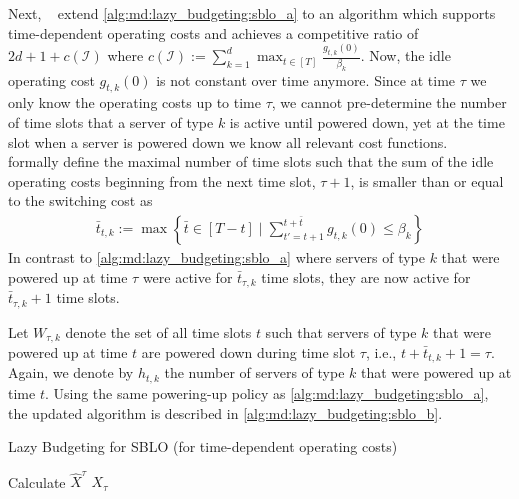 Next, \citeauthor*{Albers2021_2}~\cite{Albers2021_2} extend \cref{alg:md:lazy_budgeting:sblo_a} to an algorithm which supports time-dependent operating costs and achieves a competitive ratio of $2d + 1 + c(\mathcal{I})$ where $c(\mathcal{I}) := \sum_{k=1}^d \max_{t \in [T]} \frac{g_{t,k}(0)}{\beta_k}$. Now, the idle operating cost $g_{t,k}(0)$ is not constant over time anymore. Since at time $\tau$ we only know the operating costs up to time $\tau$, we cannot pre-determine the number of time slots that a server of type $k$ is active until powered down, yet at the time slot when a server is powered down we know all relevant cost functions. \citeauthor*{Albers2021_2}~\cite{Albers2021_2} formally define the maximal number of time slots such that the sum of the idle operating costs beginning from the next time slot, $\tau+1$, is smaller than or equal to the switching cost as \begin{align*}
    \bar{t}_{t,k} := \max \left\{\bar{t} \in [T - t] \mid \sum_{t' = t+1}^{t+\bar{t}} g_{t,k}(0) \leq \beta_k\right\}
\end{align*} In contrast to \cref{alg:md:lazy_budgeting:sblo_a} where servers of type $k$ that were powered up at time $\tau$ were active for $\bar{t}_{\tau,k}$ time slots, they are now active for $\bar{t}_{\tau,k} + 1$ time slots.

Let $W_{\tau,k}$ denote the set of all time slots $t$ such that servers of type $k$ that were powered up at time $t$ are powered down during time slot $\tau$, i.e., $t + \bar{t}_{t,k} + 1 = \tau$. Again, we denote by $h_{t,k}$ the number of servers of type $k$ that were powered up at time $t$. Using the same powering-up policy as \cref{alg:md:lazy_budgeting:sblo_a}, the updated algorithm is described in \cref{alg:md:lazy_budgeting:sblo_b}.

\begin{algorithm}
    \caption{Lazy Budgeting for SBLO (for time-dependent operating costs)~\cite{Albers2021_2}}\label{alg:md:lazy_budgeting:sblo_b}
    Calculate $\hat{X}^{\tau}$\;
    \Return $X_{\tau}$\;
\end{algorithm}

